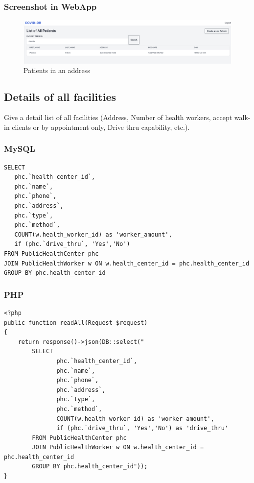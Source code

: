 \subsubsection{Screenshot in WebApp}   

\begin{figure}[H]
    \centering
    \includegraphics[scale=0.25]{imgs/patientsbyadr.png}
    \caption{Patients in an address}
\end{figure}



\subsection{Details of all facilities}
Give a detail list of all facilities (Address, Number of health workers, accept
walk-in clients or by appointment only, Drive thru capability, etc.).

\subsubsection{MySQL}
\begin{verbatim}
SELECT
   phc.`health_center_id`,
   phc.`name`,
   phc.`phone`,
   phc.`address`,
   phc.`type`,
   phc.`method`,
   COUNT(w.health_worker_id) as 'worker_amount',
   if (phc.`drive_thru`, 'Yes','No')
FROM PublicHealthCenter phc
JOIN PublicHealthWorker w ON w.health_center_id = phc.health_center_id
GROUP BY phc.health_center_id

\end{verbatim}

\subsubsection{PHP}
\begin{verbatim}
<?php
public function readAll(Request $request)
{
    return response()->json(DB::select("
        SELECT
               phc.`health_center_id`,
               phc.`name`,
               phc.`phone`,
               phc.`address`,
               phc.`type`,
               phc.`method`,
               COUNT(w.health_worker_id) as 'worker_amount',
               if (phc.`drive_thru`, 'Yes','No') as 'drive_thru'
        FROM PublicHealthCenter phc
        JOIN PublicHealthWorker w ON w.health_center_id = phc.health_center_id
        GROUP BY phc.health_center_id"));
}

\end{verbatim}

